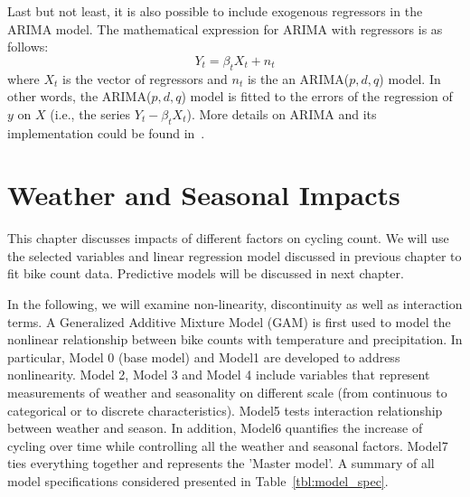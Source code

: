 \documentclass [11pt, proquest] {uwthesis}[2015/03/03]
\begin{document}
Last but not least, it is also possible to include exogenous regressors in the ARIMA model. The mathematical expression for ARIMA with regressors is as follows:
\[Y_t = \beta_t X_t + n_t\]
where $X_t$ is the vector of regressors and $n_t$ is the an ARIMA($p,d,q$) model. In other words, the ARIMA($p,d,q$) model is fitted to the errors of the regression of $y$ on $X$ (i.e., the series $Y_t - \beta_t X_t$). More details on ARIMA and its implementation could be found in~\cite{Hall11}.


 
\chapter{Weather and Seasonal Impacts}
\label{chp:impactanalysis}
This chapter discusses impacts of different factors on cycling count. We will use the selected variables and linear regression model discussed in previous chapter to fit bike count data.  Predictive models will be discussed in next chapter.

In the following, we will examine non-linearity, discontinuity as well as interaction terms. A Generalized Additive Mixture Model (GAM) is first used to model the nonlinear relationship between bike counts with temperature and precipitation. In particular, Model 0 (base model) and Model1 are developed to address nonlinearity. Model 2, Model 3 and Model 4 include variables that represent measurements of weather and seasonality on different scale (from continuous to categorical or to discrete characteristics). Model5 tests interaction relationship between weather and season. In addition, Model6 quantifies the increase of cycling over time while controlling all the weather and seasonal factors. Model7 ties everything together and represents the 'Master model'. A summary of all model specifications considered presented in Table~\ref{tbl:model_spec}.
\end{document}
